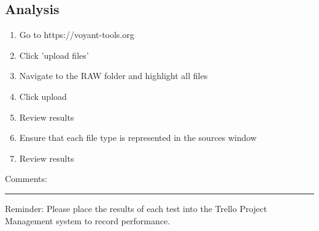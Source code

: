 \documentclass[11pt, a4paper,]{scrartcl}
\begin{document}
\subsection{Analysis}
\begin{enumerate}
    \item Go to https://voyant-tools.org
    \item Click 'upload files'
    \item Navigate to the RAW folder and highlight all files
    \item Click upload
    \item Review results
    \item Ensure that each file type is represented in the sources window
    \item Review results
\end{enumerate}
Comments:
\vspace{2cm}
\hrule

Reminder: Please place the results of each test into the Trello Project Management system to record performance.
\end{document}
